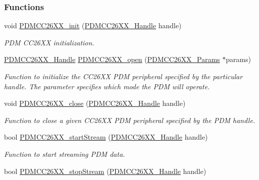 \subsubsection*{Functions}
\begin{DoxyCompactItemize}
\item 
void \hyperlink{_p_d_m_c_c26_x_x_8h_a8347c3f56db0ad7c3f357f13be098cf2}{P\+D\+M\+C\+C26\+X\+X\+\_\+init} (\hyperlink{_p_d_m_c_c26_x_x_8h_ae5b9ecc0f8eb494e162b4a0a49c0636a}{P\+D\+M\+C\+C26\+X\+X\+\_\+\+Handle} handle)
\begin{DoxyCompactList}\small\item\em P\+D\+M C\+C26\+X\+X initialization. \end{DoxyCompactList}\item 
\hyperlink{_p_d_m_c_c26_x_x_8h_ae5b9ecc0f8eb494e162b4a0a49c0636a}{P\+D\+M\+C\+C26\+X\+X\+\_\+\+Handle} \hyperlink{_p_d_m_c_c26_x_x_8h_a431d9b71e0d0eebd5ab85960f1c82ee0}{P\+D\+M\+C\+C26\+X\+X\+\_\+open} (\hyperlink{struct_p_d_m_c_c26_x_x___params}{P\+D\+M\+C\+C26\+X\+X\+\_\+\+Params} $\ast$params)
\begin{DoxyCompactList}\small\item\em Function to initialize the C\+C26\+X\+X P\+D\+M peripheral specified by the particular handle. The parameter specifies which mode the P\+D\+M will operate. \end{DoxyCompactList}\item 
void \hyperlink{_p_d_m_c_c26_x_x_8h_afb9597d25d6b2e02f6903bf6652d4371}{P\+D\+M\+C\+C26\+X\+X\+\_\+close} (\hyperlink{_p_d_m_c_c26_x_x_8h_ae5b9ecc0f8eb494e162b4a0a49c0636a}{P\+D\+M\+C\+C26\+X\+X\+\_\+\+Handle} handle)
\begin{DoxyCompactList}\small\item\em Function to close a given C\+C26\+X\+X P\+D\+M peripheral specified by the P\+D\+M handle. \end{DoxyCompactList}\item 
bool \hyperlink{_p_d_m_c_c26_x_x_8h_af5fafd7c475117bd3ed6783273c2220d}{P\+D\+M\+C\+C26\+X\+X\+\_\+start\+Stream} (\hyperlink{_p_d_m_c_c26_x_x_8h_ae5b9ecc0f8eb494e162b4a0a49c0636a}{P\+D\+M\+C\+C26\+X\+X\+\_\+\+Handle} handle)
\begin{DoxyCompactList}\small\item\em Function to start streaming P\+D\+M data. \end{DoxyCompactList}\item 
bool \hyperlink{_p_d_m_c_c26_x_x_8h_aebd3b158f38ba1489a56efe5b9a722d2}{P\+D\+M\+C\+C26\+X\+X\+\_\+stop\+Stream} (\hyperlink{_p_d_m_c_c26_x_x_8h_ae5b9ecc0f8eb494e162b4a0a49c0636a}{P\+D\+M\+C\+C26\+X\+X\+\_\+\+Handle} handle)

\end{DoxyCompactItemize}
